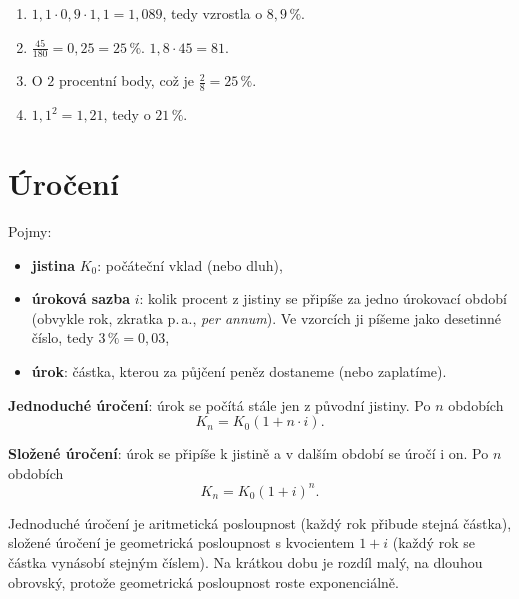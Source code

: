 \begin{solution}
  \begin{enumerate}[label=(\alph*)]
    \item $1{,}1\cdot 0{,}9\cdot 1{,}1 = 1{,}089$, tedy vzrostla o $8{,}9\,\%$.
    \item $\frac{45}{180} = 0{,}25 = 25\,\%$. $1{,}8\cdot 45 = 81$.
    \item O $2$ procentní body, což je $\frac{2}{8} = 25\,\%$.
    \item $1{,}1^2 = 1{,}21$, tedy o $21\,\%$.
  \end{enumerate}
\end{solution}

\section{Úročení}\label{sec:uroceni}

\begin{definitionbox}
  Pojmy:
  \begin{itemize}
    \item \textbf{jistina} $K_0$: počáteční vklad (nebo dluh),
    \item \textbf{úroková sazba} $i$: kolik procent z jistiny se připíše za jedno úrokovací období (obvykle rok, zkratka p.\,a., \textit{per annum}). Ve vzorcích ji píšeme jako desetinné číslo, tedy $3\,\% = 0{,}03$,
    \item \textbf{úrok}: částka, kterou za půjčení peněz dostaneme (nebo zaplatíme).
  \end{itemize}

  \textbf{Jednoduché úročení}: úrok se počítá stále jen z původní jistiny. Po $n$ obdobích
  \begin{equation*}
    K_n = K_0(1 + n\cdot i).
  \end{equation*}

  \textbf{Složené úročení}: úrok se připíše k jistině a v dalším období se úročí i on. Po $n$ obdobích
  \begin{equation*}
    K_n = K_0{(1 + i)}^n.
  \end{equation*}
\end{definitionbox}

Jednoduché úročení je aritmetická posloupnost (každý rok přibude stejná částka), složené úročení je geometrická posloupnost s kvocientem $1 + i$ (každý rok se částka vynásobí stejným číslem). Na krátkou dobu je rozdíl malý, na dlouhou obrovský, protože geometrická posloupnost roste exponenciálně.


